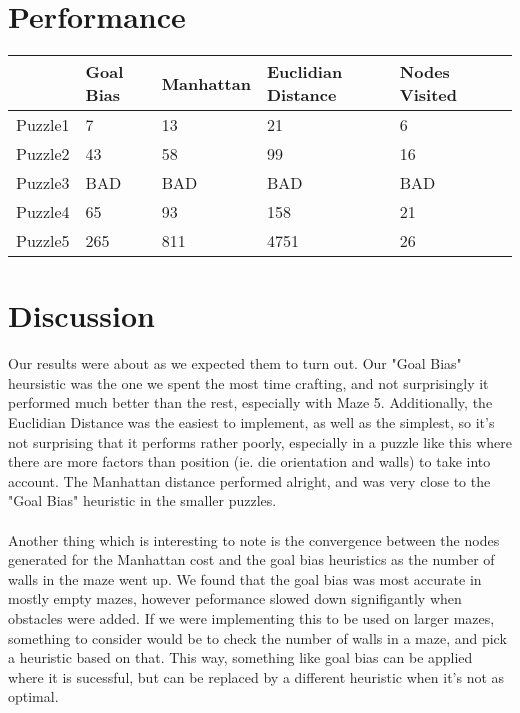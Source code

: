 \documentclass{article}
\begin{document}
\section*{Performance}
\begin{center}
    \begin{tabular}{ | l | l | l |l|l|l}
    \hline
      &   Goal Bias &  Manhattan  & Euclidian Distance & Nodes Visited  \\ \hline
    Puzzle1 & 7 & 13&21&6  \\ \hline
    Puzzle2 & 43 & 58&99&16  \\ \hline
    Puzzle3 & BAD & BAD&BAD&BAD \\ \hline
    Puzzle4 & 65 & 93&158&21 \\ \hline
    Puzzle5 & 265 & 811&4751&26 \\ \hline

    \end{tabular}
\end{center}

\section*{Discussion}
Our results were about as we expected them to turn out.  Our "Goal Bias" heursistic was the one we spent the most time crafting, and not surprisingly it performed much better than the rest, especially with Maze 5.  Additionally, the Euclidian Distance was the easiest to implement, as well as the simplest, so it's not surprising that it performs rather poorly, especially in a puzzle like this where there are more factors than position (ie. die orientation and walls) to take into account.  The Manhattan distance performed alright, and was very close to the "Goal Bias" heuristic in the smaller puzzles.  \\\\
Another thing which is interesting to note is the convergence between the nodes generated for the Manhattan cost and the goal bias heuristics as the number of walls in the maze went up.  We found that the goal bias was most accurate in mostly empty mazes, however peformance slowed down signifigantly when obstacles were added.  If we were implementing this to be used on larger mazes, something to consider would be to check the number of walls in a maze, and pick a heuristic based on that.  This way, something like goal bias can be applied where it is sucessful, but can be replaced by a different heuristic when it's not as optimal.  
\end{document}
